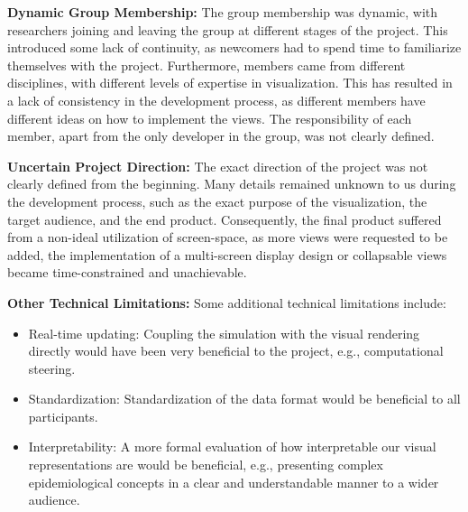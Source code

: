 \vspace*{3mm}
\noindent
\textbf{Dynamic Group Membership:}
The group membership was dynamic, with researchers joining and leaving the group at different stages of the project.
This introduced some lack of continuity, as newcomers had to spend time to familiarize themselves with the project.
Furthermore, members came from different disciplines, with different levels of expertise in visualization.
This has resulted in a lack of consistency in the development process, as different members have different ideas on how to implement the views.
The responsibility of each member, apart from the only developer in the group, was not clearly defined.

\vspace*{3mm}
\noindent
\textbf{Uncertain Project Direction:}
The exact direction of the project was not clearly defined from the beginning.
Many details remained unknown to us during the development process, such as the exact purpose of the visualization, the target audience, and the end product.
Consequently, the final product suffered from a non-ideal utilization of screen-space, as more views were requested to be added, the implementation of a multi-screen display design or collapsable views became time-constrained and unachievable.

\vspace*{3mm}
\noindent
\textbf{Other Technical Limitations:} 
Some additional technical limitations include:
\begin{itemize}[itemsep=0pt,topsep=0pt]
    \item Real-time updating: Coupling the simulation with the visual rendering directly would have been very beneficial to the project, e.g., computational steering.
    \item Standardization: Standardization of the data format would be beneficial to all participants.
    \item Interpretability: A more formal evaluation of how interpretable our visual representations are would be beneficial, e.g., presenting complex epidemiological concepts in a clear and understandable manner to a wider audience.
\end{itemize}